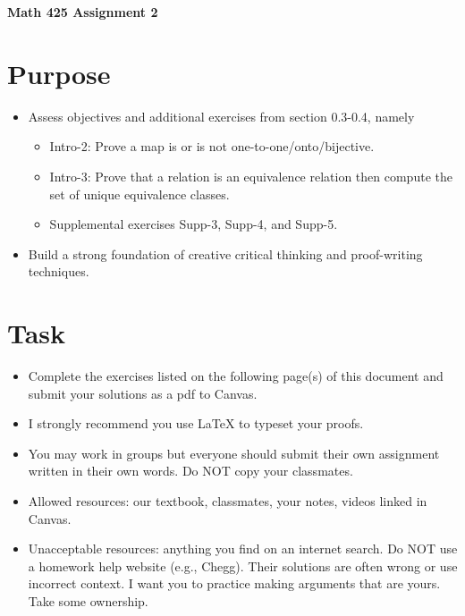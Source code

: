 \documentclass[12pt]{article}
\begin{document}
	\begin{center}
		{\Large \bf Math 425 Assignment 2}
	\end{center}
	\section*{Purpose}
		\begin{itemize}
			\item Assess objectives and additional exercises from section 0.3-0.4, namely
				\begin{itemize}
					\item Intro-2: Prove a map is or is not one-to-one/onto/bijective.
					\item Intro-3: Prove that a relation is an equivalence relation then compute the set of unique equivalence classes.
					\item Supplemental exercises Supp-3, Supp-4, and Supp-5. 
				\end{itemize}
			\item Build a strong foundation of creative critical thinking and proof-writing techniques.
		\end{itemize}
	\section*{Task}
		\begin{itemize}
			\item Complete the exercises listed on the following page(s) of this document and submit your solutions as a pdf to Canvas.
			\item I strongly recommend you use LaTeX to typeset your proofs.
			\item You may work in groups but everyone should submit their own assignment written in their own words.  Do NOT copy your classmates.
			\item Allowed resources: our textbook, classmates, your notes, videos linked in Canvas.
			\item Unacceptable resources: anything you find on an internet search. Do NOT use a homework help website (e.g., Chegg). Their solutions are often wrong or use incorrect context.  I want you to practice making arguments that are yours. Take some ownership.
		\end{itemize}
\end{document}
